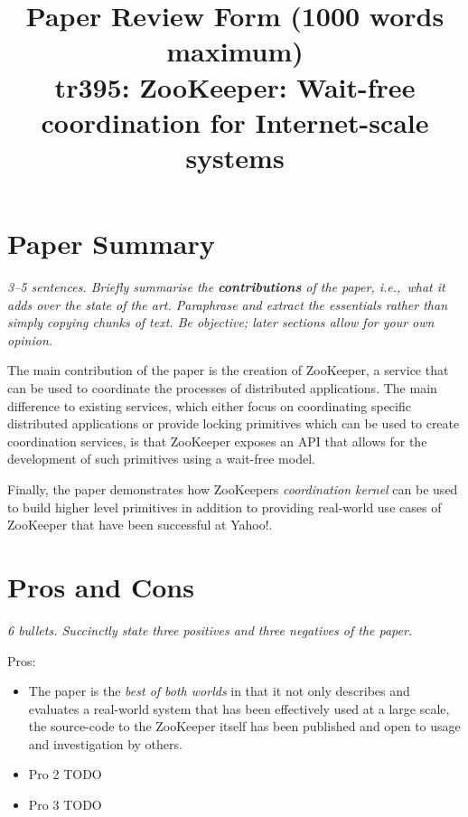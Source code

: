 \documentclass[11pt]{article}
\begin{document}

\title{Paper Review Form (1000 words maximum)\\
    tr395: ZooKeeper: Wait-free coordination for Internet-scale systems \cite{ZooKeeper}}

\maketitle

\section*{Paper Summary}

\textsl{3--5 sentences. Briefly summarise the {\bf contributions} of the paper,
i.e.,~what it adds over the state of the art. Paraphrase and extract the
essentials rather than simply copying chunks of text. Be objective; later
sections allow for your own opinion.}

The main contribution of the paper is the creation of ZooKeeper, a service that
can be used to coordinate the processes of distributed applications. The main
difference to existing services, which either focus on coordinating specific
distributed applications or provide locking primitives which can be used to
create coordination services, is that ZooKeeper exposes an API that allows for
the development of such primitives using a wait-free model.

Finally, the paper demonstrates how ZooKeepers \textit{coordination kernel} can
be used to build higher level primitives in addition to providing real-world
use cases of ZooKeeper that have been successful at Yahoo!.

\section*{Pros and Cons}

\textsl{6 bullets. Succinctly state three positives and three negatives of the
paper.}

Pros:

\begin{itemize}

    \item The paper is the \textit{best of both worlds} in that it not only
    describes and evaluates a real-world system that has been effectively used
    at a large scale, the source-code to the ZooKeeper itself has been
    published and open to usage and investigation by others.

    \item Pro 2 TODO

    \item Pro 3 TODO

\end{itemize}
\end{document}
